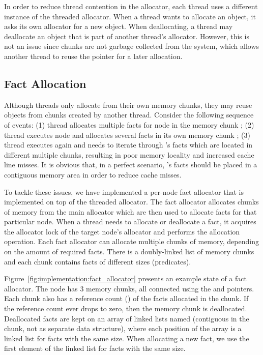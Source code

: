 In order to reduce thread contention in the allocator, each thread uses a
different instance of the threaded allocator. When a thread wants to allocate an
object, it asks its own allocator for a new object. When deallocating, a thread
may deallocate an object that is part of another thread's allocator. However,
this is not an issue since chunks are not garbage collected from the system,
which allows another thread to reuse the pointer for a later allocation.

\subsection{Fact Allocation}

Although threads only allocate from their own memory chunks, they may reuse
objects from chunks created by another thread. Consider the following sequence
of events: (1) thread  allocates multiple facts for node  in
the memory chunk ; (2) thread  executes node  and
allocates several facts in its own memory chunk ; (3) thread 
executes  again and needs to iterate through 's facts which are
located in different multiple chunks, resulting in poor memory locality and
increased cache line misses. It is obvious that, in a perfect scenario,
's facts should be placed in a contiguous memory area in order to reduce
cache misses.

To tackle these issues, we have implemented a per-node fact allocator that is
implemented on top of the threaded allocator. The fact allocator allocates
chunks of memory from the main allocator which are then used to allocate facts
for that particular node. When a thread needs to allocate or deallocate a fact,
it acquires the allocator lock of the target node's allocator and performs the
allocation operation. Each fact allocator can allocate multiple chunks of
memory, depending on the amount of required facts. There is a doubly-linked list
of memory chunks and each chunk contains facts of different sizes (predicates).

Figure~\ref{fig:implementation:fact_allocator} presents an example state of a
fact allocator. The node has 3 memory chunks, all connected using the
 and  pointers. Each chunk also has a reference count
() of the facts allocated in the chunk. If the reference count
ever drops to zero, then the memory chunk is deallocated. Deallocated facts are
kept on an array of linked lists named  (contiguous in the
chunk, not as separate data structure), where each position of the array is a
linked list for facts with the same size. When allocating a new fact, we use the
first element of the linked list for facts with the same size.

